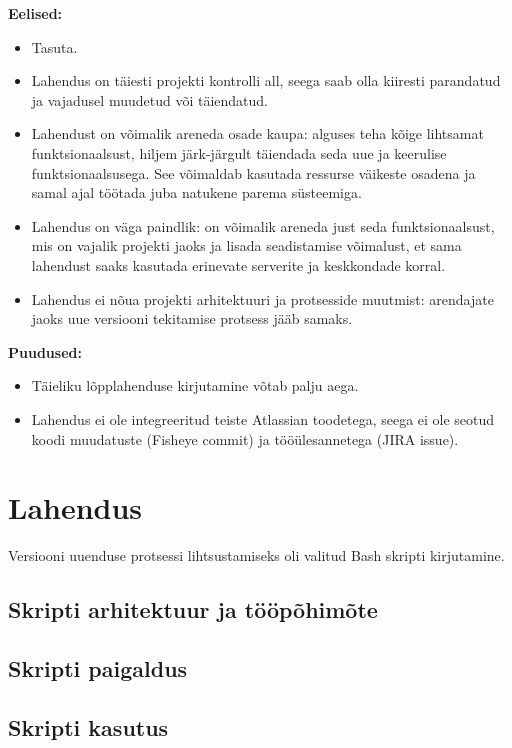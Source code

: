 \documentclass[12pt]{report}
\begin{document}
  \textbf{Eelised:}
  \begin{itemize}
    \item Tasuta.
    \item Lahendus on täiesti projekti kontrolli all, seega saab olla kiiresti parandatud ja vajadusel muudetud või täiendatud.
    \item Lahendust on võimalik areneda osade kaupa: alguses teha kõige lihtsamat funktsionaalsust, hiljem järk-järgult täiendada seda uue ja keerulise funktsionaalsusega. See võimaldab kasutada ressurse väikeste osadena ja samal ajal töötada juba natukene parema süsteemiga.
    \item Lahendus on väga paindlik: on võimalik areneda just seda funktsionaalsust, mis on vajalik projekti jaoks ja lisada seadistamise võimalust, et sama lahendust saaks kasutada erinevate serverite ja keskkondade korral.
    \item Lahendus ei nõua projekti arhitektuuri ja protsesside muutmist: arendajate jaoks uue versiooni tekitamise protsess jääb samaks.
  \end{itemize}
  
  \textbf{Puudused:}
  \begin{itemize}
    \item Täieliku lõpplahenduse kirjutamine võtab palju aega.
    \item Lahendus ei ole integreeritud teiste Atlassian toodetega, seega ei ole seotud koodi muudatuste (Fisheye commit) ja tööülesannetega (JIRA issue).
  \end{itemize}
  
  \newpage
  
  \section{Lahendus}
  
  Versiooni uuenduse protsessi lihtsustamiseks oli valitud Bash skripti kirjutamine.
  
  \subsection{Skripti arhitektuur ja tööpõhimõte}
  
  \subsection{Skripti paigaldus}
  
  \subsection{Skripti kasutus}
  
\end{document}

